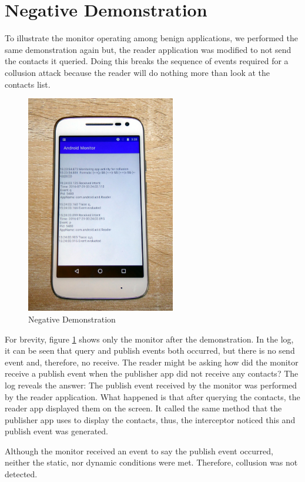 \newpage

\section{Negative Demonstration}

To illustrate the monitor operating among benign applications, we performed the same demonstration again but, the reader application was modified to not send the contacts it queried.  Doing this breaks the sequence of events required for a collusion attack because the reader will do nothing more than look at the contacts list.

\begin{figure}
	\centering
	\vspace{-12pt}
	\includegraphics[width=0.58\textwidth]{graphics/PhonePhotos/10 - NegativeTest.jpg}
	\caption{Negative Demonstration}
	\label{fig:NegativeDemonstration}
\end{figure}

For brevity, figure \ref{fig:NegativeDemonstration} shows only the monitor after the demonstration.  In the log, it can be seen that query and publish events both occurred, but there is no send event and, therefore, no receive.  The reader might be asking how did the monitor receive a publish event when the publisher app did not receive any contacts?  The log reveals the answer:  The publish event received by the monitor was performed by the reader application.  What happened is that after querying the contacts, the reader app displayed them on the screen.  It called the same method that the publisher app uses to display the contacts, thus, the interceptor noticed this and publish event was generated.  

Although the monitor received an event to say the publish event occurred, neither the static, nor dynamic conditions were met.  Therefore, collusion was not detected.